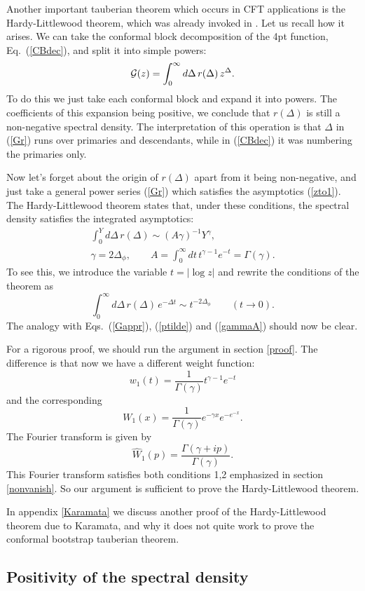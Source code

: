 \documentclass[12pt]{article}
\newcommand{\reef}[1]{(\ref{#1})}
\newcommand{\beq}{\begin{equation}}
\newcommand{\eeq}{\end{equation}}
\def\calG {{\cal G}}
\numberwithin{equation}{section}
\begin{document}
Another important tauberian theorem which occurs in CFT applications is the Hardy-Littlewood theorem, which was already invoked in \cite{Pappadopulo:2012jk}. Let us recall how it arises. We can take the conformal block decomposition of the 4pt function, Eq.~\reef{CBdec}, and split it into simple powers:
\beq
\label{Gr}
\calG(z) = \int_0^\infty d\Delta\, r(\Delta)\, z^\Delta.
\eeq
To do this we just take each conformal block and expand it into powers. The coefficients of this expansion being positive, we conclude that $r(\Delta)$ is still a non-negative spectral density. The interpretation of this operation is that $\Delta$ in \reef{Gr} runs over primaries and descendants, while in \reef{CBdec} it was numbering the primaries only.

Now let's forget about the origin of $r(\Delta)$ apart from it being non-negative, and just take a general power series \reef{Gr} which satisfies the asymptotics \reef{zto1}. The Hardy-Littlewood theorem states that, under these conditions, the spectral density satisfies the integrated asymptotics:
\begin{gather}
\int_0^Y d\Delta\,r(\Delta) \sim (A\gamma)^{-1} Y^\gamma,\\
\gamma = 2\Delta_\phi,\qquad A=\int_0^\infty dt\,t^{\gamma-1} e^{-t} =\Gamma(\gamma).
\end{gather}
To see this, we introduce the variable $t=|\log z|$ and rewrite the conditions of the theorem as
\beq
\int_0^\infty d\Delta\, r(\Delta)\, e^{-\Delta t}\sim t^{-2\Delta_\phi}\qquad(t\to0).
\eeq
The analogy with Eqs.~\reef{Gappr}, \reef{ptilde} and \reef{gammaA} should now be clear.

For a rigorous proof, we should run the argument in section \ref{proof}. The difference is that now we have a different weight function:
\beq
w_1(t) = \frac{1}{\Gamma(\gamma)} t^{\gamma-1} e^{-t}
\eeq
and the corresponding
\beq
W_1(x) = \frac{1}{\Gamma(\gamma)} e^{-\gamma x} e^{-e^{-x}}.
\eeq
The Fourier transform is given by
\beq
\label{MW1HL}
\hat W_1(p) = \frac{\Gamma(\gamma+ip)}{\Gamma(\gamma)}.
\eeq
This Fourier transform satisfies both conditions 1,2 emphasized in section \ref{nonvanish}. So our argument is sufficient to prove the Hardy-Littlewood theorem.

In appendix \ref{Karamata} we discuss another proof of the Hardy-Littlewood theorem due to Karamata, and why it does not quite work to prove the conformal bootstrap tauberian theorem. 

\subsection{Positivity of the spectral density}
\end{document}
